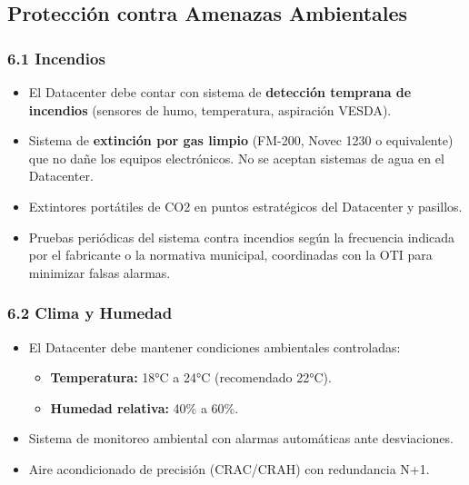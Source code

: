 \documentclass[10pt,letterpaper]{article}
\begin{document}
\subsection{Protección contra Amenazas
Ambientales}\label{protecciuxf3n-contra-amenazas-ambientales}

\subsubsection{6.1 Incendios}\label{incendios}

\begin{itemize}
\tightlist
\item
  El Datacenter debe contar con sistema de \textbf{detección temprana de
  incendios} (sensores de humo, temperatura, aspiración VESDA).
\item
  Sistema de \textbf{extinción por gas limpio} (FM-200, Novec 1230 o
  equivalente) que no dañe los equipos electrónicos. No se aceptan
  sistemas de agua en el Datacenter.
\item
  Extintores portátiles de CO2 en puntos estratégicos del Datacenter y
  pasillos.
\item
  Pruebas periódicas del sistema contra incendios según la frecuencia
  indicada por el fabricante o la normativa municipal, coordinadas con
  la OTI para minimizar falsas alarmas.
\end{itemize}

\subsubsection{6.2 Clima y Humedad}\label{clima-y-humedad}

\begin{itemize}
\tightlist
\item
  El Datacenter debe mantener condiciones ambientales controladas:

  \begin{itemize}
  \tightlist
  \item
    \textbf{Temperatura:} 18°C a 24°C (recomendado 22°C).
  \item
    \textbf{Humedad relativa:} 40\% a 60\%.
  \end{itemize}
\item
  Sistema de monitoreo ambiental con alarmas automáticas ante
  desviaciones.
\item
  Aire acondicionado de precisión (CRAC/CRAH) con redundancia N+1.
\end{itemize}
\end{document}
